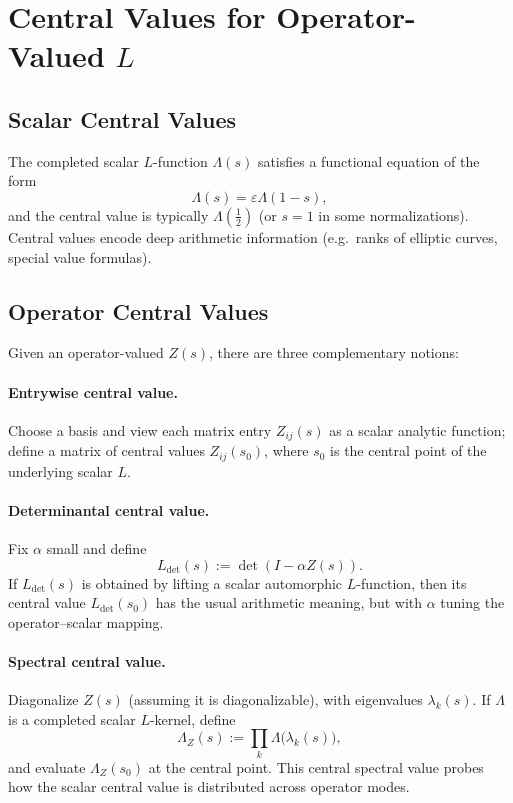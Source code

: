 \documentclass[11pt]{article}
\begin{document}
\section{Central Values for Operator-Valued $L$}

\subsection{Scalar Central Values}

The completed scalar $L$-function $\Lambda(s)$ satisfies a functional
equation of the form
\[
  \Lambda(s) = \varepsilon \Lambda(1-s),
\]
and the central value is typically $\Lambda(\tfrac{1}{2})$ (or $s=1$
in some normalizations). Central values encode deep arithmetic
information (e.g.\ ranks of elliptic curves, special value formulas).

\subsection{Operator Central Values}

Given an operator-valued $Z(s)$, there are three complementary notions:

\paragraph{Entrywise central value.}
Choose a basis and view each matrix entry $Z_{ij}(s)$ as a scalar
analytic function; define a matrix of central values $Z_{ij}(s_0)$,
where $s_0$ is the central point of the underlying scalar $L$.

\paragraph{Determinantal central value.}
Fix $\alpha$ small and define
\[
  L_{\det}(s) := \det(I - \alpha Z(s)).
\]
If $L_{\det}(s)$ is obtained by lifting a scalar automorphic $L$-function,
then its central value $L_{\det}(s_0)$ has the usual arithmetic meaning,
but with $\alpha$ tuning the operator--scalar mapping.

\paragraph{Spectral central value.}
Diagonalize $Z(s)$ (assuming it is diagonalizable), with eigenvalues
$\lambda_k(s)$. If $\Lambda$ is a completed scalar $L$-kernel, define
\[
  \Lambda_Z(s) := \prod_k \Lambda\bigl(\lambda_k(s)\bigr),
\]
and evaluate $\Lambda_Z(s_0)$ at the central point. This central
spectral value probes how the scalar central value is distributed
across operator modes.
\end{document}
